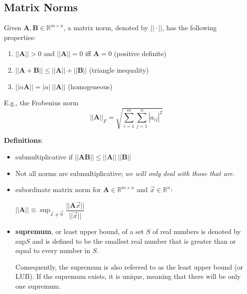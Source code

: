 \documentclass[12pt]{article}
\newcommand{\ve}[1]{\ensuremath{\mathbf{#1}}}
\begin{document}
\subsection*{Matrix Norms}
Given $\ve{A}, \ve{B} \in \mathbb{R}^{m \times n}$, a matrix norm, denoted by $|| \cdot ||$, has the following properties:
%
\begin{enumerate}
\item $||\ve{A}|| > 0$ and $||\ve{A}|| = 0$ iff $\ve{A} = 0$ (positive definite)
\item $||\ve{A} + \ve{B}|| \leq ||\ve{A}|| + ||\ve{B}||$ (triangle inequality)
\item $||\alpha \ve{A}|| = |\alpha|\: ||\ve{A}||$ (homogeneous)
\end{enumerate}

E.g., the Frobenius norm 
%
\begin{equation}
||\ve{A}||_F = \sqrt{ \sum_{i=1}^m \sum_{j=1}^n |a_{ij}|^2 } \nonumber
\end{equation}

\textbf{Definitions}:
\begin{itemize}
\item submultiplicative if $||\ve{A} \ve{B}|| \leq ||\ve{A}||\: ||\ve{B}||$

\item Not all norms are submultiplicative; \textit{we will only deal with those that are.} 

\item subordinate matrix norm for $\ve{A} \in \mathbb{R}^{m \times n}$ and $\vec{x} \in \mathbb{R}^n$:

$||\ve{A}|| \equiv \displaystyle \sup_{\vec{x} \neq \vec{0}} \dfrac{||\ve{A}\vec{x}||}{||\vec{x}||}$

\item \textbf{supremum}, or least upper bound, of a set $S$ of real numbers is denoted by sup$S$ and is defined to be the smallest real number that is greater than or equal to every number in $S$.

Consequently, the supremum is also referred to as the least upper bound (or LUB). If the supremum exists, it is unique, meaning that there will be only one supremum. 
\end{itemize}
\end{document}
